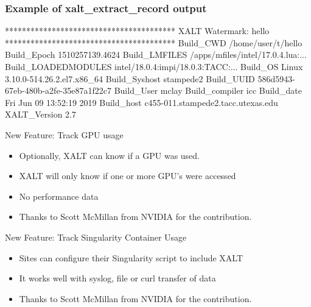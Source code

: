 \documentclass{beamer}
\begin{document}
\begin{frame}[fragile]
    \frametitle{Example of xalt\_extract\_record output}
 {\small
    \begin{semiverbatim}
****************************************
XALT Watermark: hello
****************************************
Build\_CWD            /home/user/t/hello
Build\_Epoch          1510257139.4624
Build\_LMFILES        /apps/mfiles/intel/17.0.4.lua:...
Build\_LOADEDMODULES  intel/18.0.4:impi/18.0.3:TACC:...
Build\_OS             Linux 3.10.0-514.26.2.el7.x86_64
Build\_Syshost        stampede2
Build\_UUID           586d5943-67eb-480b-a2fe-35e87a1f22c7
Build\_User           mclay
Build\_compiler       icc
Build\_date           Fri Jun 09 13:52:19 2019
Build\_host           c455-011.stampede2.tacc.utexas.edu
XALT\_Version         2.7
    \end{semiverbatim}
}
\end{frame}

\begin{frame}{New Feature: Track GPU usage}
  \begin{itemize}
    \item Optionally, XALT can know if a GPU was used.
    \item XALT will only know if one or more GPU's were accessed
    \item No performance data
    \item Thanks to Scott McMillan from NVIDIA for the contribution.
  \end{itemize}
\end{frame}

\begin{frame}{New Feature: Track Singularity Container Usage}
  \begin{itemize}
    \item Sites can configure their Singularity script to include XALT
    \item It works well with syslog, file  or curl transfer of data
    \item Thanks to Scott McMillan from NVIDIA for the contribution.
  \end{itemize}
\end{frame}
\end{document}
